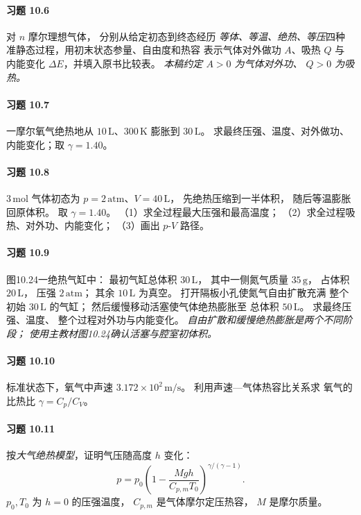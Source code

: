 \paragraph{习题 10.6}
对 \(n\) 摩尔理想气体，
分别从给定初态到终态经历
\emph{等体、等温、绝热、等压}四种
准静态过程，用初末状态参量、自由度和热容
表示气体对外做功 \(A\)、吸热 \(Q\) 与
内能变化 \(\Delta E\)，并填入原书比较表。
\textit{本稿约定 \(A>0\) 为气体对外功、
\(Q>0\) 为吸热。}

\paragraph{习题 10.7}
一摩尔氧气绝热地从
\(10\,\mathrm L\)、\(300\,\mathrm K\)
膨胀到 \(30\,\mathrm L\)。
求最终压强、温度、对外做功、
内能变化；取 \(\gamma=1.40\)。

\paragraph{习题 10.8}
\(3\,\mathrm{mol}\) 气体初态为
\(p=2\,\mathrm{atm}\)、\(V=40\,\mathrm L\)，
先绝热压缩到一半体积，
随后等温膨胀回原体积。
取 \(\gamma=1.40\)。
（1）求全过程最大压强和最高温度；
（2）求全过程吸热、对外功、内能变化；
（3）画出 \(p\)-\(V\) 路径。

\paragraph{习题 10.9}
图10.24一绝热气缸中：
最初气缸总体积 \(30\,\mathrm L\)，
其中一侧氮气质量 \(35\,\mathrm g\)，
占体积 \(20\,\mathrm L\)，
压强 \(2\,\mathrm{atm}\)；
其余 \(10\,\mathrm L\) 为真空。
打开隔板小孔使氮气自由扩散充满
整个初始 \(30\,\mathrm L\) 的气缸；
然后缓慢移动活塞使气体绝热膨胀至
总体积 \(50\,\mathrm L\)。
求最终压强、温度、
整个过程对外功与内能变化。
\textit{自由扩散和缓慢绝热膨胀是两个不同阶段；
使用主教材图10.24确认活塞与腔室初体积。}

\paragraph{习题 10.10}
标准状态下，氧气中声速
\(3.172\times10^2\,\mathrm{m/s}\)。
利用声速—气体热容比关系求
氧气的比热比 \(\gamma=C_p/C_V\)。

\paragraph{习题 10.11}
按\emph{大气绝热模型}，证明气压随高度 \(h\) 变化：
\[
 p=p_0\left(
 1-\frac{Mgh}{C_{p,m}T_0}
 \right)^{\gamma/(\gamma-1)}.
\]
\(p_0,T_0\) 为 \(h=0\) 的压强温度，
\(C_{p,m}\) 是气体摩尔定压热容，
\(M\) 是摩尔质量。

